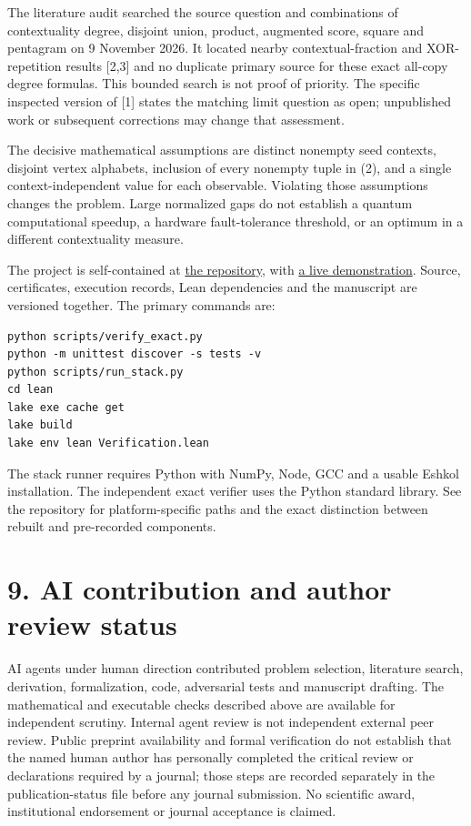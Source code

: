 \documentclass[10pt,a4paper]{article}
\begin{document}
The literature audit searched the source question and combinations of contextuality degree, disjoint union, product, augmented score, square and pentagram on 9 November 2026. It located nearby contextual-fraction and XOR-repetition results {[}2,3{]} and no duplicate primary source for these exact all-copy degree formulas. This bounded search is not proof of priority. The specific inspected version of {[}1{]} states the matching limit question as open; unpublished work or subsequent corrections may change that assessment.

The decisive mathematical assumptions are distinct nonempty seed contexts, disjoint vertex alphabets, inclusion of every nonempty tuple in (2), and a single context-independent value for each observable. Violating those assumptions changes the problem. Large normalized gaps do not establish a quantum computational speedup, a hardware fault-tolerance threshold, or an optimum in a different contextuality measure.

The project is self-contained at \href{https://github.com/0thernes/contextuality-tensor-lab}{the repository}, with \href{https://0thernes.github.io/contextuality-tensor-lab/}{a live demonstration}. Source, certificates, execution records, Lean dependencies and the manuscript are versioned together. The primary commands are:

\begin{verbatim}
python scripts/verify_exact.py
python -m unittest discover -s tests -v
python scripts/run_stack.py
cd lean
lake exe cache get
lake build
lake env lean Verification.lean
\end{verbatim}

The stack runner requires Python with NumPy, Node, GCC and a usable Eshkol installation. The independent exact verifier uses the Python standard library. See the repository for platform-specific paths and the exact distinction between rebuilt and pre-recorded components.

\section{9. AI contribution and author review status}\label{ai-contribution-and-author-review-status}

AI agents under human direction contributed problem selection, literature search, derivation, formalization, code, adversarial tests and manuscript drafting. The mathematical and executable checks described above are available for independent scrutiny. Internal agent review is not independent external peer review. Public preprint availability and formal verification do not establish that the named human author has personally completed the critical review or declarations required by a journal; those steps are recorded separately in the publication-status file before any journal submission. No scientific award, institutional endorsement or journal acceptance is claimed.
\end{document}
